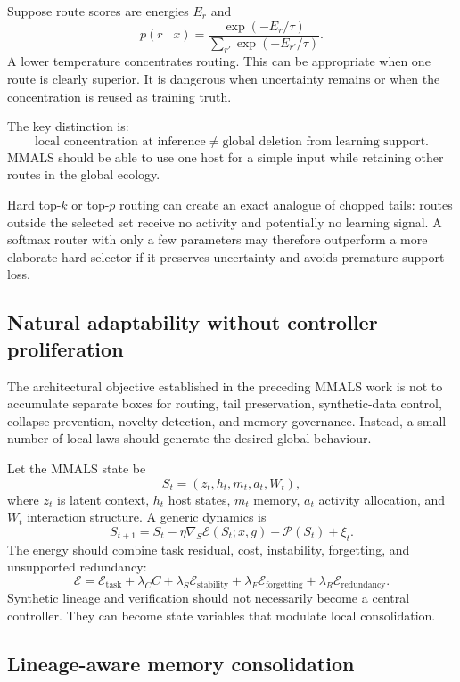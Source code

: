 Suppose route scores are energies $E_r$ and
\[
p(r\mid x)
=\frac{\exp(-E_r/\tau)}{\sum_{r'}\exp(-E_{r'}/\tau)}.
\]
A lower temperature concentrates routing. This can be appropriate when one route is clearly superior. It is dangerous when uncertainty remains or when the concentration is reused as training truth.

The key distinction is:
\[
\text{local concentration at inference}
\neq
\text{global deletion from learning support}.
\]
MMALS should be able to use one host for a simple input while retaining other routes in the global ecology.

Hard top-$k$ or top-$p$ routing can create an exact analogue of chopped tails: routes outside the selected set receive no activity and potentially no learning signal. A softmax router with only a few parameters may therefore outperform a more elaborate hard selector if it preserves uncertainty and avoids premature support loss.

\subsection{Natural adaptability without controller proliferation}

The architectural objective established in the preceding MMALS work is not to accumulate separate boxes for routing, tail preservation, synthetic-data control, collapse prevention, novelty detection, and memory governance. Instead, a small number of local laws should generate the desired global behaviour.

Let the MMALS state be
\[
S_t=(z_t,h_t,m_t,a_t,W_t),
\]
where $z_t$ is latent context, $h_t$ host states, $m_t$ memory, $a_t$ activity allocation, and $W_t$ interaction structure. A generic dynamics is
\[
S_{t+1}
=S_t-\eta\nabla_S\mathcal E(S_t;x,g)
+\mathcal P(S_t)+\xi_t.
\]
The energy should combine task residual, cost, instability, forgetting, and unsupported redundancy:
\[
\mathcal E
=
\mathcal E_{\mathrm{task}}
+\lambda_C C
+\lambda_S \mathcal E_{\mathrm{stability}}
+\lambda_F \mathcal E_{\mathrm{forgetting}}
+\lambda_R \mathcal E_{\mathrm{redundancy}}.
\]
Synthetic lineage and verification should not necessarily become a central controller. They can become state variables that modulate local consolidation.

\subsection{Lineage-aware memory consolidation}

